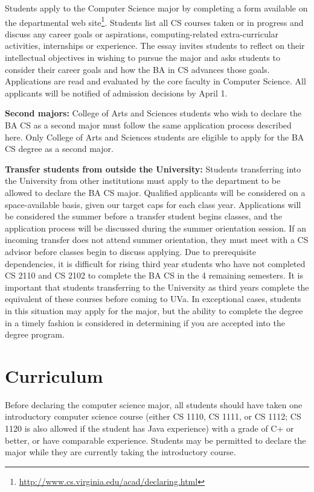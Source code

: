 \documentclass[10pt,letter,twocolumn]{book}
\newcommand{\mysection}[1]{\section{#1}\renewcommand{\rightmark}{#1}}
\newcommand{\myurl}[1]{\footnote{\scriptsize\url{#1}}}
\begin{document}
Students apply to the Computer Science major by completing a form
available on the departmental
web site\myurl{http://www.cs.virginia.edu/acad/declaring.html}. Students
list all CS courses taken or in progress and discuss any career goals
or aspirations, computing-related extra-curricular activities,
internships or experience. The essay invites students to reflect on
their intellectual objectives in wishing to pursue the major and asks
students to consider their career goals and how the BA in CS advances
those goals. Applications are read and evaluated by the core faculty
in Computer Science. All applicants will be notified of admission
decisions by April 1.

{\bf Second majors:} College of Arts and Sciences students who wish to
declare the BA CS as a second major must follow the same application
process described here. Only College of Arts and Sciences students are
eligible to apply for the BA CS degree as a second major.

{\bf Transfer students from outside the University:} Students
transferring into the University from other institutions must apply to
the department to be allowed to declare the BA CS major. Qualified
applicants will be considered on a space-available basis, given our
target caps for each class year. Applications will be considered the
summer before a transfer student begins classes, and the application
process will be discussed during the summer orientation session. If an
incoming transfer does not attend summer orientation, they must meet
with a CS advisor before classes begin to discuss applying.  Due to
prerequisite dependencies, it is difficult for rising third year
students who have not completed CS 2110 and CS 2102 to complete the
BA CS in the 4 remaining semesters. It is important that students
transferring to the University as third years complete the equivalent
of these courses before coming to UVa. In exceptional cases, students
in this situation may apply for the major, but the ability to complete
the degree in a timely fashion is considered in determining if
you are accepted into the degree program.




\mysection{Curriculum}


Before declaring the computer science major, all students should have
taken one introductory computer science course (either CS 1110, CS
1111, or CS 1112; CS 1120 is also allowed if the student has Java
experience) with a grade of C+ or better, or have comparable
experience. Students may be permitted to declare the major while they
are currently taking the introductory course.
\end{document}
